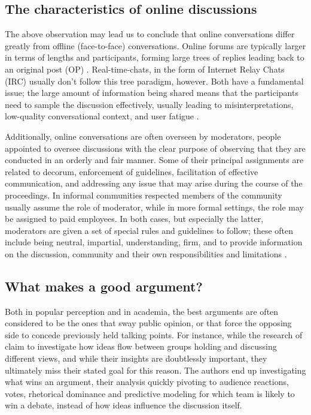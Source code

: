 \subsection{The characteristics of online discussions}
\label{sec:background:arguments-online}

The above observation may lead us to conclude that online conversations differ greatly from offline (face-to-face) conversations. Online forums are typically larger in terms of lengths and participants, forming large trees of replies leading back to an original post (OP) \cite{boschi2021wordunderstandingsampleonline}. Real-time-chats, in the form of Internet Relay Chats (IRC) usually don't follow this tree paradigm, however. Both have a fundamental issue; the large amount of information being shared means that the participants need to sample the discussion effectively, usually leading to misinterpretations, low-quality conversational context, and user fatigue \cite{boschi2021wordunderstandingsampleonline}. 

Additionally, online conversations are often overseen by moderators, people appointed to oversee discussions with the clear purpose of observing that they are conducted in an orderly and fair manner. Some of their principal assignments are related to decorum, enforcement of guidelines, facilitation of effective communication, and addressing any issue that may arise during the course of the proceedings. In informal communities respected members of the community usually assume the role of moderator, while in more formal settings, the role may be assigned to paid employees. In both cases, but especially the latter, moderators are given a set of special rules and guidelines to follow; these often include being neutral, impartial, understanding, firm, and to provide information on the discussion, community and their own responsibilities and limitations \cite{Cornell_eRulemaking2017}.

\subsection{What makes a good argument?}
\label{sec:background:good-argument}

Both in popular perception and in academia, the best arguments are often considered to be the ones that sway public opinion, or that force the opposing side to concede previously held talking points. For instance, while the research of \cite{zhang2016-oxford} claim to investigate how ideas flow between groups holding and discussing different views, and while their insights are doubtlessly important, they ultimately miss their stated goal for this reason. The authors end up investigating what wins an argument, their analysis quickly pivoting to audience reactions, votes, rhetorical dominance and predictive modeling for which team is likely to win a debate, instead of how ideas influence the discussion itself.

